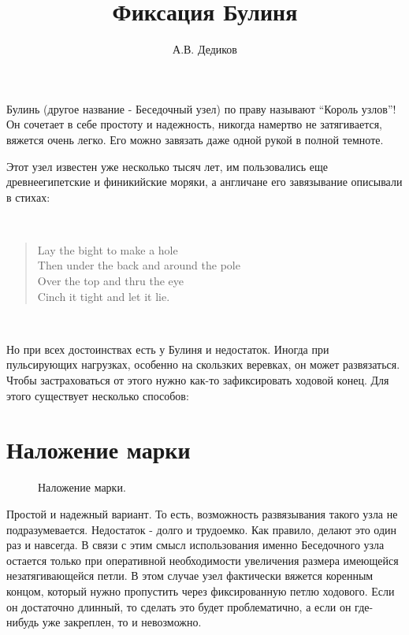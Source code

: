 \documentclass{artikel1}
\begin{document}

\title{Фиксация Булиня}
\date{}
\author{А.В. Дедиков}

\maketitle

Булинь (другое название - Беседочный узел) по праву называют ``Король узлов''! Он сочетает в себе простоту и надежность, никогда намертво не затягивается, вяжется очень легко. Его можно завязать даже одной рукой в полной темноте.

Этот узел известен уже несколько тысяч лет, им пользовались еще древнеегипетские и финикийские моряки, а англичане его завязывание описывали в стихах:

~\
\begin{verse}%
Lay the bight to make a hole \\
Then under the back and around the pole \\
Over the top and thru the eye \\
Cinch it tight and let it lie.
\end{verse}
~\

Но при всех достоинствах есть у Булиня и недостаток. Иногда при пульсирующих нагрузках, особенно на скользких веревках, он может развязаться. Чтобы застраховаться от этого нужно как-то зафиксировать ходовой конец. Для этого существует несколько способов:

\section{Наложение марки}

\begin{figure}[H]\centering
	\begin{minipage}{1\linewidth}
		\begin{center}
			\tcbox[enhanced jigsaw,colframe=black,opacityframe=0.5,opacityback=0.5]
			{\centering{}}
		\end{center}
	\end{minipage}
\caption{Наложение марки.}
\label{ris:Besedochny_marka}
\end{figure}

Простой и надежный вариант. То есть, возможность развязывания такого узла не подразумевается. Недостаток - долго и трудоемко. Как правило, делают это один раз и навсегда. В связи с этим смысл использования именно Беседочного узла остается только при оперативной необходимости увеличения размера имеющейся незатягивающейся петли. В этом случае узел фактически вяжется коренным концом, который нужно пропустить через фиксированную петлю ходового. Если он достаточно длинный, то сделать это будет проблематично, а если он где-нибудь уже закреплен, то и невозможно.
\end{document}
